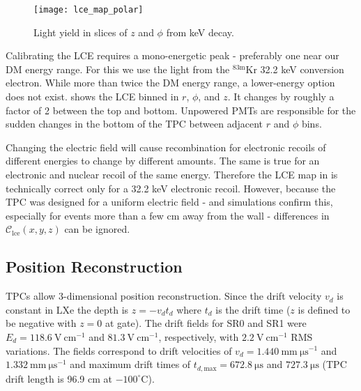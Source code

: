 \begin{figure}
\centering
\texttt{[image: lce\_map\_polar]}
\caption{Light yield in slices of $z$ and $\phi$ from  keV decay.}
\label{fig:calibrations_lce_polar}
\end{figure}

Calibrating the LCE requires a mono-energetic peak - preferably one near our DM energy range.  For this we use the light from the
$\mathrm{^{83m}Kr}$ 32.2 keV conversion electron.  While more than twice the DM energy range, a lower-energy option does
not exist.   shows the LCE binned in $r$, $\phi$, and $z$.  It changes by roughly a factor of 2 between
the top and bottom.  Unpowered PMTs are responsible for the sudden changes in the bottom of the TPC between adjacent $r$ and $\phi$ bins.

Changing the electric field will cause recombination for electronic recoils of different energies to change by different amounts.  The
same is true for an electronic and nuclear recoil of the same energy.  Therefore the LCE map in  is
technically correct only for a 32.2 keV electronic recoil.  However, because the TPC was designed for a uniform electric field - and
simulations confirm this, especially for events more than a few cm away from the wall - differences in
$\mathcal{C}_{\mathrm{lce}}(x, y, z)$ can be ignored.



\subsection{Position Reconstruction}
\label{subsec:det_char_position_reconstruction}
TPCs allow 3-dimensional position reconstruction.  Since the drift velocity $v_d$
is constant in LXe the depth is $z = -v_d t_d$ where $t_d$ is the drift time ($z$ is defined to be negative with
$z = 0$ at gate).  The drift fields for SR0 and SR1 were $E_d = 118.6\ \mathrm{V\ cm^{-1}}$ and $81.3\ \mathrm{V\ cm^{-1}}$,
respectively, with $2.2\ \mathrm{V\ cm^{-1}}$ RMS variations.  The fields correspond to drift velocities of
$v_d = 1.440\ \mathrm{mm\ \mu s^{-1}}$ and $1.332\ \mathrm{mm\ \mu s^{-1}}$ and
maximum drift times of $t_{d, \mathrm{max}} = 672.8\ \mathrm{\mu s}$ and $727.3\ \mathrm{\mu s}$ (TPC drift length is 96.9
cm at $-100^{\circ}\mathrm{C}$).

